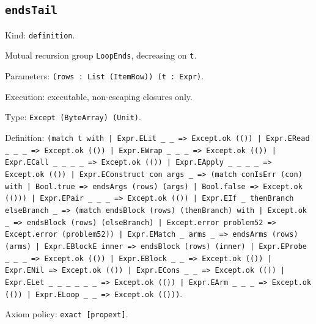 \documentclass[11pt]{article}
\begin{document}
\subsection*{\texttt{endsTail}}
\noindent Kind: \texttt{definition}.\par
\noindent Mutual recursion group \texttt{LoopEnds}, decreasing on \texttt{t}.\par
\noindent Parameters: \texttt{(rows : List (ItemRow)) (t : Expr)}.\par
\noindent Execution: executable, non-escaping closures only.\par
\noindent Type: \texttt{Except (ByteArray) (Unit)}.\par
\noindent Definition: \texttt{(match t with | Expr.ELit \_ \_ => Except.ok (()) | Expr.ERead \_ \_ \_ => Except.ok (()) | Expr.EWrap \_ \_ \_ => Except.ok (()) | Expr.ECall \_ \_ \_ \_ => Except.ok (()) | Expr.EApply \_ \_ \_ \_ => Except.ok (()) | Expr.EConstruct con args \_ => (match conIsErr (con) with | Bool.true => endsArgs (rows) (args) | Bool.false => Except.ok (())) | Expr.EPair \_ \_ \_ => Except.ok (()) | Expr.EIf \_ thenBranch elseBranch \_ => (match endsBlock (rows) (thenBranch) with | Except.ok \_ => endsBlock (rows) (elseBranch) | Except.error problem52 => Except.error (problem52)) | Expr.EMatch \_ arms \_ => endsArms (rows) (arms) | Expr.EBlockE inner => endsBlock (rows) (inner) | Expr.EProbe \_ \_ \_ => Except.ok (()) | Expr.EBlock \_ \_ => Except.ok (()) | Expr.ENil => Except.ok (()) | Expr.ECons \_ \_ => Except.ok (()) | Expr.ELet \_ \_ \_ \_ \_ \_ => Except.ok (()) | Expr.EArm \_ \_ \_ => Except.ok (()) | Expr.ELoop \_ \_ => Except.ok (()))}.\par
\noindent Axiom policy: \texttt{exact [propext]}.\par
\end{document}
